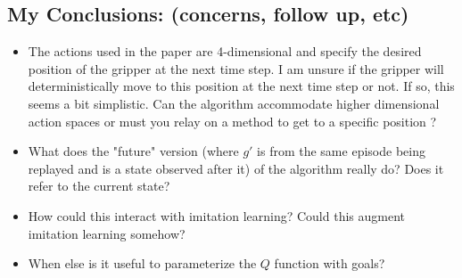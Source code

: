 \subsection{My Conclusions: (concerns, follow up, etc)}
\begin{itemize}
\item The actions used in the paper are 4-dimensional and specify the desired position of the gripper at the next time step. 
I am unsure if the gripper will deterministically move to this position at the next time step or not. If so, this seems
a bit simplistic. Can the algorithm accommodate higher dimensional action spaces or must you relay on a method to get
to a specific position ? 
\item What does the "future" version (where $g'$ is from the same episode being replayed and is a state observed after it)
of the algorithm really do? Does it refer to the current state?
\item How could this interact with imitation learning? Could this augment imitation learning somehow? 
\item When else is it useful to parameterize the $Q$ function with goals?
\end{itemize}


